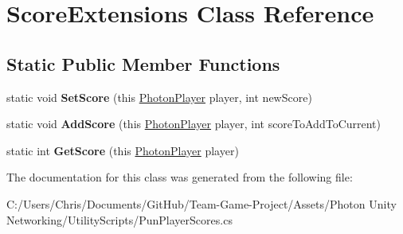 \hypertarget{class_score_extensions}{}\section{Score\+Extensions Class Reference}
\label{class_score_extensions}
\subsection*{Static Public Member Functions}
\begin{DoxyCompactItemize}
\item 
static void {\bfseries Set\+Score} (this \hyperlink{class_photon_player}{Photon\+Player} player, int new\+Score)\hypertarget{class_score_extensions_a2d1da421395ccb914dcece4cf7a30d0b}{}\label{class_score_extensions_a2d1da421395ccb914dcece4cf7a30d0b}

\item 
static void {\bfseries Add\+Score} (this \hyperlink{class_photon_player}{Photon\+Player} player, int score\+To\+Add\+To\+Current)\hypertarget{class_score_extensions_a66160db09cc1365f8548262b3799cc31}{}\label{class_score_extensions_a66160db09cc1365f8548262b3799cc31}

\item 
static int {\bfseries Get\+Score} (this \hyperlink{class_photon_player}{Photon\+Player} player)\hypertarget{class_score_extensions_a5da6e5d39f3217f3b00305f9dab02d84}{}\label{class_score_extensions_a5da6e5d39f3217f3b00305f9dab02d84}

\end{DoxyCompactItemize}


The documentation for this class was generated from the following file\+:\begin{DoxyCompactItemize}
\item 
C\+:/\+Users/\+Chris/\+Documents/\+Git\+Hub/\+Team-\/\+Game-\/\+Project/\+Assets/\+Photon Unity Networking/\+Utility\+Scripts/Pun\+Player\+Scores.\+cs\end{DoxyCompactItemize}
